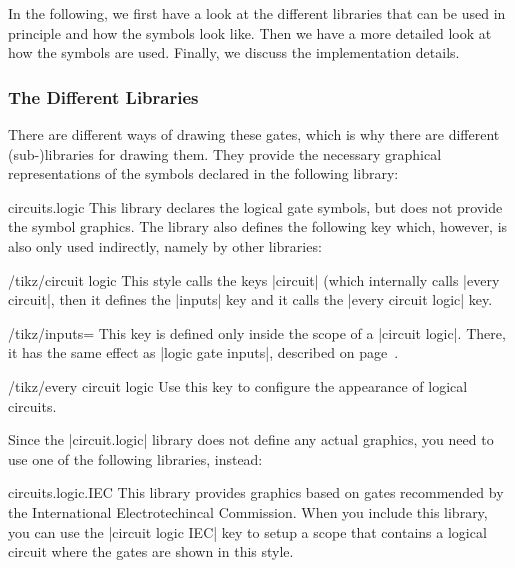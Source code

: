 In the following, we first have a look at the different libraries that
can be used in principle and how the symbols look like. Then we have a
more detailed look at how the symbols are used. Finally, we discuss
the implementation details.


\subsubsection{The Different Libraries}

There are different ways of drawing these gates, which is why there
are different (sub-)libraries for drawing them. They provide the necessary
graphical representations of the symbols declared in the following
library: 

\begin{tikzlibrary}{circuits.logic}
  This library declares the logical gate symbols, but does not 
  provide the symbol graphics.
  The library also defines the following key which, however, is also
  only used indirectly, namely by other libraries:
  \begin{key}{/tikz/circuit logic}
    This style calls the keys |circuit| (which internally calls
    |every circuit|, then it defines the |inputs| key and it calls the
    |every circuit logic| key.
    \begin{key}{/tikz/inputs=}
      This key is defined only inside the scope of a
      |circuit logic|. There, it has the same effect as
      |logic gate inputs|, described on
      page~\pageref{logic-gates-inputs}. 
    \end{key}
    \begin{stylekey}{/tikz/every circuit logic}
      Use this key to configure the appearance of logical circuits.      
    \end{stylekey}
  \end{key}
\end{tikzlibrary}

Since the |circuit.logic| library does not define any actual graphics,
you need to use one of the following libraries, instead:

\begin{pgflibrary}{circuits.logic.IEC}
  This library provides graphics based on gates
  recommended by the International Electrotechincal Commission.  When
  you include this library, you can use the |circuit logic IEC| key to
  setup a scope that contains a logical circuit where the gates are 
  shown in this style.
\end{pgflibrary}

